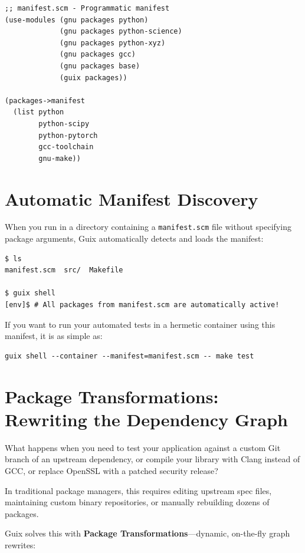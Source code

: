 \begin{lstlisting}[style=guixscheme]
;; manifest.scm - Programmatic manifest
(use-modules (gnu packages python)
             (gnu packages python-science)
             (gnu packages python-xyz)
             (gnu packages gcc)
             (gnu packages base)
             (guix packages))

(packages->manifest
  (list python
        python-scipy
        python-pytorch
        gcc-toolchain
        gnu-make))
\end{lstlisting}

\section{Automatic Manifest Discovery}

When you run  in a directory containing a \texttt{manifest.scm} file without specifying package arguments, Guix automatically detects and loads the manifest:

\begin{lstlisting}[style=guixcli]
$ ls
manifest.scm  src/  Makefile

$ guix shell
[env]$ # All packages from manifest.scm are automatically active!
\end{lstlisting}

If you want to run your automated tests in a hermetic container using this manifest, it is as simple as:

\begin{lstlisting}[style=guixcli]
guix shell --container --manifest=manifest.scm -- make test
\end{lstlisting}

\section{Package Transformations: Rewriting the Dependency Graph}

What happens when you need to test your application against a custom Git branch of an upstream dependency, or compile your library with Clang instead of GCC, or replace OpenSSL with a patched security release?

In traditional package managers, this requires editing upstream spec files, maintaining custom binary repositories, or manually rebuilding dozens of packages.

Guix solves this with \textbf{Package Transformations}---dynamic, on-the-fly graph rewrites:

